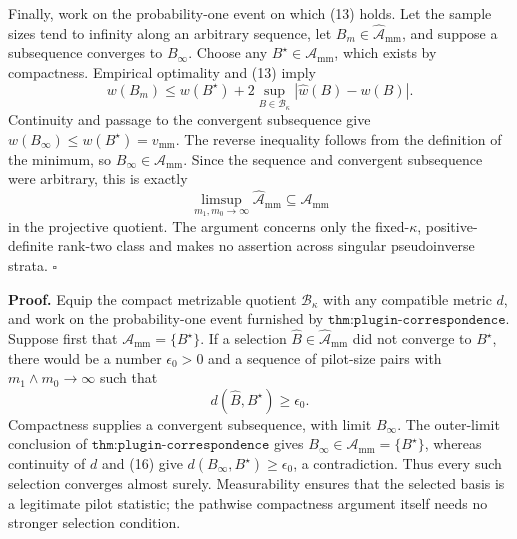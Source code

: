 Finally, work on the probability-one event on which (13) holds.  Let the sample sizes tend to infinity along an arbitrary sequence, let \(B_m\in\widehat{\mathcal A}_{\mathrm{mm}}\), and suppose a subsequence converges to \(B_\infty\).  Choose any \(B^\star\in\mathcal A_{\mathrm{mm}}\), which exists by compactness.  Empirical optimality and (13) imply
\[
w(B_m)
\le w(B^\star)+2\sup_{B\in\mathcal B_\kappa}
|\widehat w(B)-w(B)|.
\tag{15}
\]
Continuity and passage to the convergent subsequence give \(w(B_\infty)\le w(B^\star)=v_{\mathrm{mm}}\).  The reverse inequality follows from the definition of the minimum, so \(B_\infty\in\mathcal A_{\mathrm{mm}}\).  Since the sequence and convergent subsequence were arbitrary, this is exactly
\[
\limsup_{m_1,m_0\to\infty}\widehat{\mathcal A}_{\mathrm{mm}}
\subseteq\mathcal A_{\mathrm{mm}}
\]
in the projective quotient.  The argument concerns only the fixed-\(\kappa\), positive-definite rank-two class and makes no assertion across singular pseudoinverse strata. \(\square\)

\textbf{Proof.}
Equip the compact metrizable quotient \(\mathcal B_\kappa\) with any compatible metric \(d\), and work on the probability-one event furnished by \(\texttt{thm:plugin-correspondence}\).  Suppose first that \(\mathcal A_{\mathrm{mm}}=\{B^\star\}\).  If a selection \(\widehat B\in\widehat{\mathcal A}_{\mathrm{mm}}\) did not converge to \(B^\star\), there would be a number \(\epsilon_0>0\) and a sequence of pilot-size pairs with \(m_1\wedge m_0\to\infty\) such that
\[
d(\widehat B,B^\star)\ge\epsilon_0.
\tag{16}
\]
Compactness supplies a convergent subsequence, with limit \(B_\infty\).  The outer-limit conclusion of \(\texttt{thm:plugin-correspondence}\) gives \(B_\infty\in\mathcal A_{\mathrm{mm}}=\{B^\star\}\), whereas continuity of \(d\) and (16) give \(d(B_\infty,B^\star)\ge\epsilon_0\), a contradiction.  Thus every such selection converges almost surely.  Measurability ensures that the selected basis is a legitimate pilot statistic; the pathwise compactness argument itself needs no stronger selection condition.

